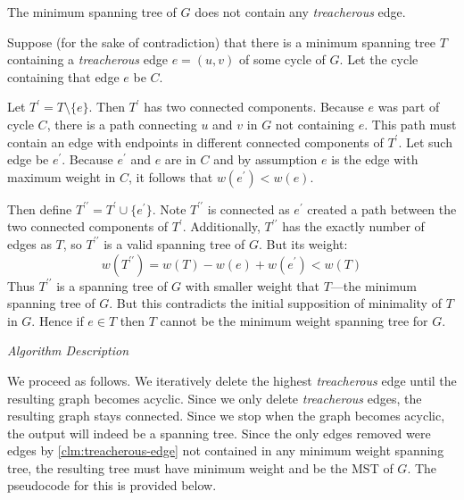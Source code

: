 \documentclass{article}
\begin{document}
\begin{enumerate}[leftmargin={*}, font={\bf}, label={\arabic*.}, ref={\arabic*}]
    \begin{claim}
      \label{clm:treacherous-edge}
      The minimum spanning tree of $G$ does not contain any \textit{treacherous} edge.
    \end{claim}

    \begin{proof*}
      Suppose (for the sake of contradiction) that there is a minimum spanning tree $T$ containing
      a \textit{treacherous} edge $e = (u, v)$ of some cycle of $G$. Let the cycle containing that
      edge $e$ be $C$.

      Let $T^\prime = T \setminus \{e\}$. Then $T^\prime$ has two connected components. Because
      $e$ was part of cycle $C$, there is a path connecting $u$ and $v$ in $G$ not containing $e$.
      This path must contain an edge with endpoints in different connected components of $T^\prime$.
      Let such edge be $e^\prime$. Because $e^\prime$ and $e$ are in $C$ and by assumption $e$ is
      the edge with maximum weight in $C$, it follows that $w(e^\prime) < w(e)$.

      Then define $T^{\prime\prime} = T^\prime \cup \{e^\prime\}$. Note $T^{\prime\prime}$ is
      connected as $e^\prime$ created a path between the two connected components of $T^\prime$.
      Additionally, $T^{\prime\prime}$ has the exactly number of edges as $T$, so $T^{\prime\prime}$
      is a valid spanning tree of $G$. But its weight:
      \[
        w(T^{\prime\prime}) = w(T) - w(e) + w(e^\prime) < w(T)
      \]
      Thus $T^{\prime\prime}$ is a spanning tree of $G$ with smaller weight that $T$---the minimum
      spanning tree of $G$. But this contradicts the initial supposition of minimality of $T$ in $G$.
      Hence if $e \in T$ then $T$ cannot be the minimum weight spanning tree for $G$.
    \end{proof*}

    \bigskip

    {\itshape Algorithm Description}

    We proceed as follows. We iteratively delete the highest \textit{treacherous} edge until the
    resulting graph becomes acyclic. Since we only delete \textit{treacherous} edges, the resulting
    graph stays connected. Since we stop when the graph becomes acyclic, the output will indeed
    be a spanning tree. Since the only edges removed were edges by \autoref{clm:treacherous-edge}
    not contained in any minimum weight spanning tree, the resulting tree must have minimum weight
    and be the MST of $G$. The pseudocode for this is provided below.


\end{enumerate}
\end{document}
